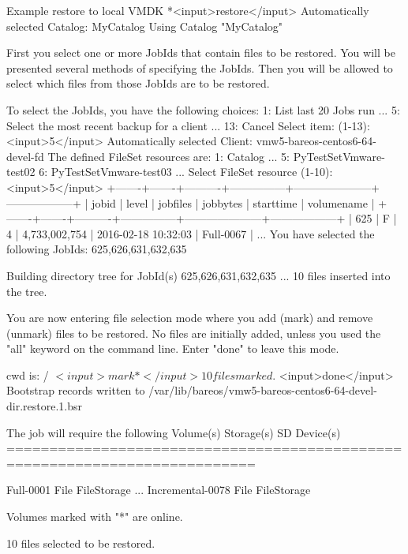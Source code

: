 \begin{commands}{Example restore to local VMDK}
*<input>restore</input>
Automatically selected Catalog: MyCatalog
Using Catalog "MyCatalog"

First you select one or more JobIds that contain files
to be restored. You will be presented several methods
of specifying the JobIds. Then you will be allowed to
select which files from those JobIds are to be restored.

To select the JobIds, you have the following choices:
     1: List last 20 Jobs run
     ...
     5: Select the most recent backup for a client
     ...
    13: Cancel
Select item:  (1-13): <input>5</input>
Automatically selected Client: vmw5-bareos-centos6-64-devel-fd
The defined FileSet resources are:
     1: Catalog
     ...
     5: PyTestSetVmware-test02
     6: PyTestSetVmware-test03
     ...
Select FileSet resource (1-10): <input>5</input>
+-------+-------+----------+---------------+---------------------+------------------+
| jobid | level | jobfiles | jobbytes      | starttime           | volumename       |
+-------+-------+----------+---------------+---------------------+------------------+
|   625 | F     |        4 | 4,733,002,754 | 2016-02-18 10:32:03 | Full-0067        |
...
You have selected the following JobIds: 625,626,631,632,635

Building directory tree for JobId(s) 625,626,631,632,635 ...  
10 files inserted into the tree.

You are now entering file selection mode where you add (mark) and
remove (unmark) files to be restored. No files are initially added, unless
you used the "all" keyword on the command line.
Enter "done" to leave this mode.

cwd is: /
$ <input>mark *</input>
10 files marked.
$ <input>done</input>
Bootstrap records written to /var/lib/bareos/vmw5-bareos-centos6-64-devel-dir.restore.1.bsr

The job will require the following
   Volume(s)                 Storage(s)                SD Device(s)
===========================================================================
   
    Full-0001                 File                      FileStorage
    ...
    Incremental-0078          File                      FileStorage

Volumes marked with "*" are online.

10 files selected to be restored.


\end{commands}
